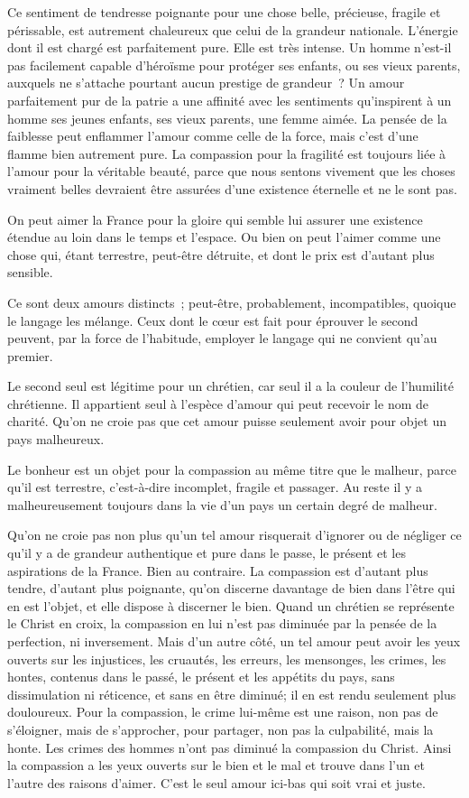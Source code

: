 \documentclass[french,twoside]{book} %
\begin{document}
Ce sentiment de tendresse poignante pour une chose belle, précieuse, fragile et périssable, est autrement chaleureux que celui de la grandeur nationale. L'énergie dont il est chargé est parfaitement pure. Elle est très intense. Un homme n'est-il pas facilement capable d'héroïsme pour protéger ses enfants, ou ses vieux parents, auxquels ne s'attache pourtant aucun prestige de grandeur ? Un amour parfaitement pur de la patrie a une affinité avec les sentiments qu'inspirent à un homme ses jeunes enfants, ses vieux parents, une femme aimée. La pensée de la faiblesse peut enflammer l'amour comme celle de la force, mais c'est d'une flamme bien autrement pure. La compassion pour la fragilité est toujours liée à l'amour pour la véritable beauté, parce que nous sentons vivement que les choses vraiment belles devraient être assurées d'une existence éternelle et ne le sont pas.\par
On peut aimer la France pour la gloire qui semble lui assurer une existence étendue au loin dans le temps et l'espace. Ou bien on peut l'aimer comme une chose qui, étant terrestre, peut-être détruite, et dont le prix est d'autant plus sensible.\par
Ce sont deux amours distincts ; peut-être, probablement, incompatibles, quoique le langage les mélange. Ceux dont le cœur est fait pour éprouver le second peuvent, par la force de l'habitude, employer le langage qui ne convient qu'au premier.\par
Le second seul est légitime pour un chrétien, car seul il a la couleur de l'humilité chrétienne. Il appartient seul à l'espèce d'amour qui peut recevoir le nom de charité. Qu'on ne croie pas que cet amour puisse seulement avoir pour objet un pays malheureux.\par
Le bonheur est un objet pour la compassion au même titre que le malheur, parce qu'il est terrestre, c'est-à-dire incomplet, fragile et passager. Au reste il y a malheureusement toujours dans la vie d'un pays un certain degré de malheur.\par
Qu'on ne croie pas non plus qu'un tel amour risquerait d'ignorer ou de négliger ce qu'il y a de grandeur authentique et pure dans le passe, le présent et les aspirations de la France. Bien au contraire. La compassion est d'autant plus tendre, d'autant plus poignante, qu'on discerne davantage de bien dans l'être qui en est l'objet, et elle dispose à discerner le bien. Quand un chrétien se représente le Christ en croix, la compassion en lui n'est pas diminuée par la pensée de la perfection, ni inversement. Mais d'un autre côté, un tel amour peut avoir les yeux ouverts sur les injustices, les cruautés, les erreurs, les mensonges, les crimes, les hontes, contenus dans le passé, le présent et les appétits du pays, sans dissimulation ni réticence, et sans en être diminué; il en est rendu seulement plus douloureux. Pour la compassion, le crime lui-même est une raison, non pas de s'éloigner, mais de s'approcher, pour partager, non pas la culpabilité, mais la honte. Les crimes des hommes n'ont pas diminué la compassion du Christ. Ainsi la compassion a les yeux ouverts sur le bien et le mal et trouve dans l'un et l'autre des raisons d'aimer. C'est le seul amour ici-bas qui soit vrai et juste.\par
\end{document}
